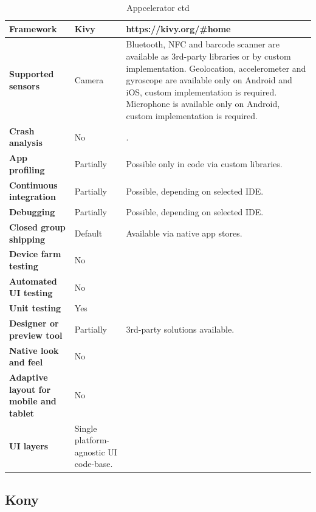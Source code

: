 \documentclass[english,master,public,dept460,male,cpdeclaration,oneside]{diploma}
\begin{document}
\begin{table}[!h]
	\centering
	\caption{Appcelerator ctd}
	\begin{tabular}{p{} | p{} | p{}}
		\toprule		
		\textbf{Framework} & \textbf{Kivy} & https://kivy.org/\#home \\
		\midrule
		\textbf{Supported sensors} & Camera & Bluetooth, NFC and barcode scanner are available as 3rd-party libraries or by custom implementation. Geolocation, accelerometer and gyroscope are available only on Android and iOS, custom implementation is required. Microphone is available only on Android, custom implementation is required. \\			
		\midrule
		\textbf{Crash analysis} & No & . \\			
		\midrule
		\textbf{App profiling} & Partially & Possible only in code via custom libraries. \\			
		\midrule
		\textbf{Continuous integration} & Partially & Possible, depending on selected IDE. \\			
		\midrule
		\textbf{Debugging} & Partially & Possible, depending on selected IDE. \\			
		\midrule
		\textbf{Closed group shipping} & Default & Available via native app stores. \\			
		\midrule
		\textbf{Device farm testing} & No & \\			
		\midrule
		\textbf{Automated UI testing} & No & \\			
		\midrule
		\textbf{Unit testing} & Yes & \\			
		\midrule
		\textbf{Designer or preview tool} & Partially & 3rd-party solutions available. \\			
		\midrule
		\textbf{Native look and feel} & No & \\			
		\midrule
		\textbf{Adaptive layout for mobile and tablet} & No & \\			
		\midrule		
		\textbf{UI layers} & Single platform-agnostic UI code-base. &  \\			
		\midrule
	\end{tabular}
\end{table}

\clearpage
\subsection{Kony}
\end{document}
